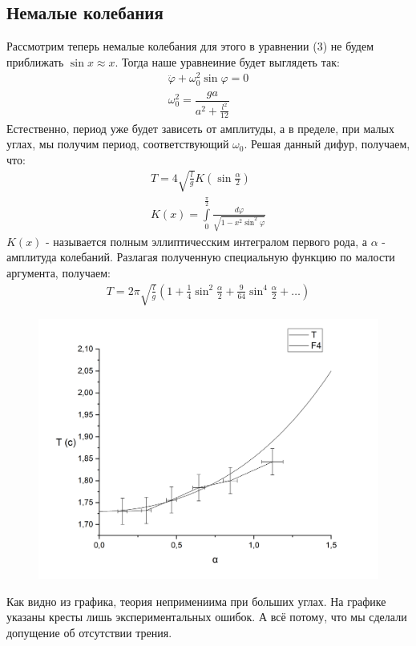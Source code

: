 \documentclass[a4paper, 10pt]{article}%
\begin{document}
\subsection*{Немалые колебания}
Рассмотрим теперь немалые колебания для этого в уравнении (3) не будем приближать $\sin x\approx x$. Тогда наше уравнеиние будет выглядеть так:
\begin{equation}
\begin{aligned}
\ddot{\varphi}+\omega_{0}^2\sin\varphi=0 \\
\omega_{0}^2=\dfrac{ga}{a^2+ \frac{l^2}{12}}
\end{aligned}
\end{equation}
Естественно, период уже будет зависеть от амплитуды, а в пределе, при малых углах, мы получим период, соответствующий $\omega_{0}$. Решая данный дифур, получаем, что:
\begin{equation}
\begin{aligned}
T=4\sqrt{\frac{l}{g}}K(\sin\frac{\alpha}{2}) \\
K(x)=\int\limits_{0}^{\frac{\pi}{2}}\frac{d\varphi}{\sqrt{1-x^2\sin^2\varphi}}
\end{aligned}
\end{equation}
$K(x)$ - называется полным эллиптичесским интегралом первого рода, а $\alpha$ - амплитуда колебаний. Разлагая полученную специальную функцию по малости аргумента, получаем:
\begin{equation}
\begin{aligned}
T=2\pi\sqrt{\frac{l}{g}}\left(1+\frac{1}{4}\sin^2\frac{\alpha}{2}+\frac{9}{64}\sin^4\frac{\alpha}{2}+\dots\right)
\end{aligned}
\end{equation}
\begin{figure}
\caption{}
\center
\includegraphics[scale=0.5]{GR1}
\end{figure}
Как видно из  графика, теория непримениима при больших углах. На графике указаны кресты лишь экспериментальных ошибок. А всё потому, что мы сделали допущение об отсутствии трения.
\end{document}
